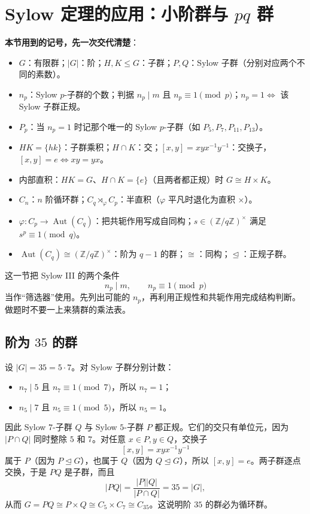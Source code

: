 \section{Sylow 定理的应用：小阶群与 $pq$ 群}


\textbf{本节用到的记号，先一次交代清楚}：

\begin{itemize}
\item $G$：有限群；$|G|$：阶；$H,K\le G$：子群；$P,Q$：Sylow 子群（分别对应两个不同的素数）。
\item $n_p$：Sylow $p$-子群的个数；判据 $n_p\mid m$ 且 $n_p\equiv1\pmod p$；$n_p=1\iff$ 该 Sylow 子群正规。
\item $P_p$：当 $n_p=1$ 时记那个唯一的 Sylow $p$-子群（如 $P_5,P_7,P_{11},P_{13}$）。
\item $HK=\{hk\}$：子群乘积；$H\cap K$：交；$[x,y]=xyx^{-1}y^{-1}$：交换子，$[x,y]=e\iff xy=yx$。
\item 内部直积：$HK=G$、$H\cap K=\{e\}$（且两者都正规）时 $G\cong H\times K$。
\item $C_n$：$n$ 阶循环群；$C_q\rtimes_\varphi C_p$：半直积（$\varphi$ 平凡时退化为直积 $\times$）。
\item $\varphi:C_p\to\operatorname{Aut}(C_q)$：把共轭作用写成自同构；$s\in(\mathbb Z/q\mathbb Z)^\times$ 满足 $s^p\equiv1\pmod q$。
\item $\operatorname{Aut}(C_q)\cong(\mathbb Z/q\mathbb Z)^\times$：阶为 $q-1$ 的群；$\cong$：同构；$\trianglelefteq$：正规子群。
\end{itemize}


这一节把 Sylow III 的两个条件
\[
n_p\mid m,\qquad n_p\equiv 1\pmod p
\]
当作“筛选器”使用。先列出可能的 $n_p$，再利用正规性和共轭作用完成结构判断。做题时不要一上来猜群的乘法表。

\subsection{阶为 $35$ 的群}


设 $|G|=35=5\cdot 7$。对 Sylow 子群分别计数：

\begin{itemize}
\item $n_7\mid 5$ 且 $n_7\equiv1\pmod7$，所以 $n_7=1$；
\item $n_5\mid 7$ 且 $n_5\equiv1\pmod5$，所以 $n_5=1$。
\end{itemize}


因此 Sylow $7$-子群 $Q$ 与 Sylow $5$-子群 $P$ 都正规。它们的交只有单位元，因为 $|P\cap Q|$ 同时整除 $5$ 和 $7$。对任意 $x\in P,y\in Q$，交换子
\[
[x,y]=xyx^{-1}y^{-1}
\]
属于 $P$（因为 $P\trianglelefteq G$），也属于 $Q$（因为 $Q\trianglelefteq G$），所以 $[x,y]=e$。两子群逐点交换，于是 $PQ$ 是子群，而且
\[
|PQ|=\frac{|P||Q|}{|P\cap Q|}=35=|G|,
\]
从而 $G=PQ\cong P\times Q\cong C_5\times C_7\cong C_{35}$。这说明阶 $35$ 的群必为循环群。

